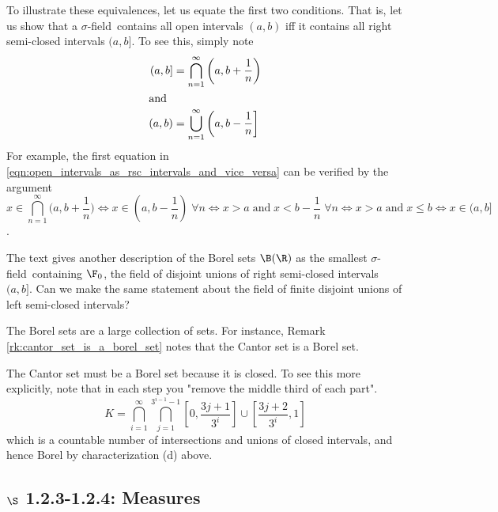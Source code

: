 \documentclass{article} %
\newif\ifActive
\renewcommand{\sf}{$\sigma$-field}
\begin{document}
\ifActive 
\textbf{Workshop Exercise}: Justify that (a) and (b) are equivalent. 
\else 
To illustrate these equivalences, let us equate the first two conditions. That is, let us show that a \sf\ contains all open intervals $(a,b)$ iff it contains all right semi-closed intervals $(a,b]$.  To see this, simply note
\begin{subequations}
\begin{align}
(a,b] &= \bigcap_{n=1}^\infty \bigg(a, b+\frac{1}{n}\bigg) \\
	\intertext{and}
(a,b) &= \bigcup_{n=1}^\infty \bigg(a, b-\frac{1}{n}\bigg] 
\end{align}
\label{eqn:open_intervals_as_rsc_intervals_and_vice_versa}
\end{subequations}
{\tiny For example, the first equation in \eqref{eqn:open_intervals_as_rsc_intervals_and_vice_versa} can be verified by the argument 
\[x \in  \bigcap_{n=1}^\infty \bigg(a, b+\frac{1}{n}\bigg) \iff x \in (a,b-\frac{1}{n}) \; \forall n \iff x>a \; \text{and} \; x < b -\frac{1}{n} \; \forall n \iff x >a \; \text{and} \; x \leq b \iff x \in (a,b] \]
.}

\fi 




\begin{question}
The text gives another description of the Borel sets $\B(\R)$ as the smallest \sf\ containing $\F_0$, the field of disjoint unions of right semi-closed intervals $(a,b]$.  Can we make the same statement about the field of finite disjoint unions of left semi-closed intervals?
\end{question}

The Borel sets are a large collection of sets.  For instance, Remark \ref{rk:cantor_set_is_a_borel_set} notes that the Cantor set is a Borel set. 

\begin{remark}{}
The Cantor set must be a Borel set because it is closed.  To see this more explicitly, note that in each step you "remove the middle third of each part".  
\[K = \bigcap_{i=1}^\infty\bigcap_{j=1}^{3^{i-1}-1}\left[0,\frac{3j+1}{3^i}\right]\cup \left[\frac{3j+2}{3^i}, 1\right] \]
which is a countable number of intersections and unions of closed intervals, and hence Borel by characterization (d) above. 
\label{rk:cantor_set_is_a_borel_set}
\end{remark}

\subsection{$\S$ 1.2.3-1.2.4: Measures}
\end{document}
